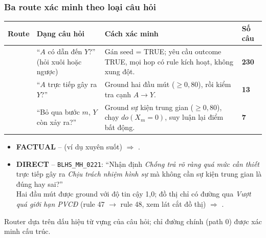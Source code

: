\begin{frame}
\frametitle{Ba route xác minh theo loại câu hỏi}
\vspace{-0.05cm}
\footnotesize
\renewcommand{\arraystretch}{1.12}
\setlength{\tabcolsep}{4pt}
\begin{tabular}{@{}>{\raggedright\arraybackslash}p{}
                >{\raggedright\arraybackslash}p{}
                >{\raggedright\arraybackslash}p{}
                >{\centering\arraybackslash}p{}@{}}
\toprule
\textbf{Route} & \textbf{Dạng câu hỏi} & \textbf{Cách xác minh} & \textbf{Số câu}\\
\midrule
{\color{stepVerify}\textbf{FACTUAL}} & ``$A$ có dẫn đến $Y$?'' (hỏi xuôi hoặc ngược)
  & Gán seed = TRUE; yêu cầu outcome TRUE, mọi hop có rule kích hoạt, không xung đột. & \textbf{230}\\
{\color{stepVerify}\textbf{DIRECT}} & ``$A$ trực tiếp gây ra $Y$?''
  & Ground hai đầu mút ($\ge0{,}80$), rồi kiểm tra cạnh $A\to Y$. & \textbf{13}\\
{\color{stepVerify}\textbf{INTERVENTION}} & ``Bỏ qua bước $m$, $Y$ còn xảy ra?''
  & Ground sự kiện trung gian ($\ge0{,}80$), chạy $do(X_m=0)$, suy luận lại điểm bất động. & \textbf{7}\\
\bottomrule
\end{tabular}

\vspace{0.2cm}
\begin{itemize}
  \item \textbf{FACTUAL} -- \exid{} (ví dụ xuyên suốt) $\Rightarrow$ \labSup.
  \item \textbf{DIRECT} -- \texttt{BLHS\_MH\_0221}: ``Nhận định \textit{Chống trả rõ ràng quá mức cần thiết}
        trực tiếp gây ra \textit{Chịu trách nhiệm hình sự} mà không cần sự kiện trung gian là đúng hay sai?''\\
        Hai đầu mút được ground với độ tin cậy 1,0; đồ thị chỉ có đường qua
        \textit{Vượt quá giới hạn PVCĐ} (rule 47 $\rightarrow$ rule 48, xem lát cắt đồ thị) $\Rightarrow$ \labRej.
\end{itemize}

\vspace{0.2cm}
{\scriptsize\color{schemaGray} Router dựa trên dấu hiệu từ vựng của câu hỏi; chỉ đường chính (path 0) được xác minh cấu trúc.}
\end{frame}

